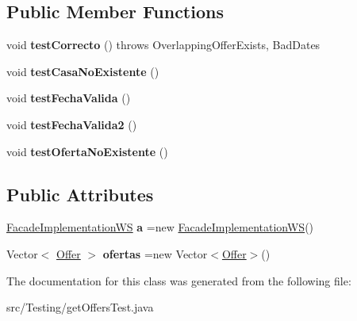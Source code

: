 \subsection*{Public Member Functions}
\begin{DoxyCompactItemize}
\item 
\mbox{\label{class_testing_1_1get_offers_test_a5e5ead486850d6a541b72cc97dd2efe5}} 
void {\bfseries test\+Correcto} ()  throws Overlapping\+Offer\+Exists, Bad\+Dates 
\item 
\mbox{\label{class_testing_1_1get_offers_test_aab84a688f8f352be6ed2ec1240f5e350}} 
void {\bfseries test\+Casa\+No\+Existente} ()
\item 
\mbox{\label{class_testing_1_1get_offers_test_a9ad0a640a38332759435e89eb8f891f5}} 
void {\bfseries test\+Fecha\+Valida} ()
\item 
\mbox{\label{class_testing_1_1get_offers_test_a71e1b54d6cb2a107543498540ea56803}} 
void {\bfseries test\+Fecha\+Valida2} ()
\item 
\mbox{\label{class_testing_1_1get_offers_test_a21fd531ddb00f1073b1068e5ec32064b}} 
void {\bfseries test\+Oferta\+No\+Existente} ()
\end{DoxyCompactItemize}
\subsection*{Public Attributes}
\begin{DoxyCompactItemize}
\item 
\mbox{\label{class_testing_1_1get_offers_test_a5a94d6f9909d85742e140e7030f81d5a}} 
\mbox{\hyperlink{classbusiness_logic_1_1_facade_implementation_w_s}{Facade\+Implementation\+WS}} {\bfseries a} =new \mbox{\hyperlink{classbusiness_logic_1_1_facade_implementation_w_s}{Facade\+Implementation\+WS}}()
\item 
\mbox{\label{class_testing_1_1get_offers_test_a2031e3e284394c2ae6a3fbeae0e0c539}} 
Vector$<$ \mbox{\hyperlink{classdomain_1_1_offer}{Offer}} $>$ {\bfseries ofertas} =new Vector$<$\mbox{\hyperlink{classdomain_1_1_offer}{Offer}}$>$()
\end{DoxyCompactItemize}


The documentation for this class was generated from the following file\+:\begin{DoxyCompactItemize}
\item 
src/\+Testing/get\+Offers\+Test.\+java\end{DoxyCompactItemize}
